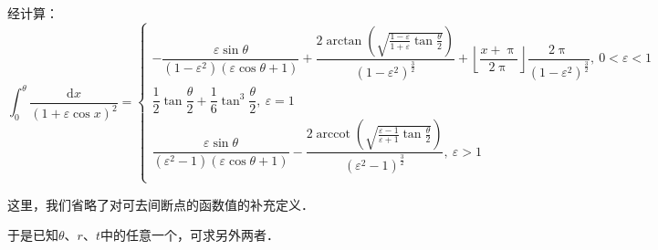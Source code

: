 \documentclass[UTF8,fontset=none,linespread=1.2]{ctexart}
\DeclareMathOperator{\arctanh}{arccot}
\newcommand{\upd}{\mathrm{d}}
\begin{document}
经计算：$$\int_0^{\theta}\dfrac{\upd x}{(1+\varepsilon\cos x)^2}=\left\lbrace\begin{array}{l}
-\dfrac{\varepsilon\sin\theta}{(1-\varepsilon^2)(\varepsilon\cos\theta+1)}+\dfrac{2\arctan\left(\sqrt{\frac{1-\varepsilon}{1+\varepsilon}\tan\frac\theta2}\right)}{(1-\varepsilon^2)^{\frac32}}+\left\lfloor\dfrac{x+\uppi}{2\uppi}\right\rfloor\dfrac{2\uppi}{(1-\varepsilon^2)^{\frac32}},\ 0<\varepsilon<1\\
\dfrac12\tan\dfrac\theta2+\dfrac16\tan^3\dfrac\theta2,\ \varepsilon=1\\
\dfrac{\varepsilon\sin\theta}{(\varepsilon^2-1)(\varepsilon\cos\theta+1)}-\dfrac{2\arctanh\left(\sqrt{\frac{\varepsilon-1}{\varepsilon+1}\tan\frac\theta2}\right)}{(\varepsilon^2-1)^{\frac32}},\ \varepsilon>1\\
\end{array}\right.$$

这里，我们省略了对可去间断点的函数值的补充定义．

于是已知$\theta$、$r$、$t$中的任意一个，可求另外两者．
\end{document}
